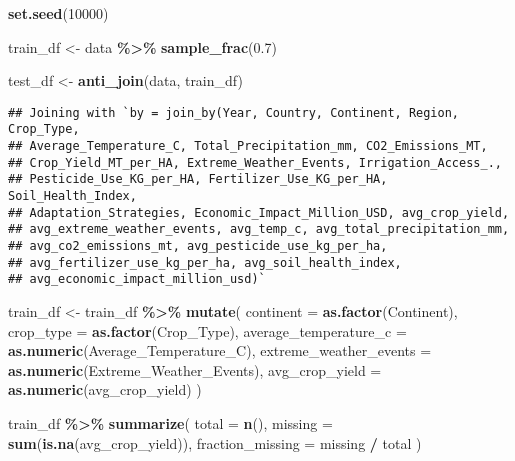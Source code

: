 \documentclass[
]{article}
\newenvironment{Shaded}{\begin{snugshade}}{\end{snugshade}}
\newcommand{\AttributeTok}[1]{\textcolor[rgb]{0.13,0.29,0.53}{#1}}
\newcommand{\DecValTok}[1]{\textcolor[rgb]{0.00,0.00,0.81}{#1}}
\newcommand{\FloatTok}[1]{\textcolor[rgb]{0.00,0.00,0.81}{#1}}
\newcommand{\FunctionTok}[1]{\textcolor[rgb]{0.13,0.29,0.53}{\textbf{#1}}}
\newcommand{\NormalTok}[1]{#1}
\newcommand{\OtherTok}[1]{\textcolor[rgb]{0.56,0.35,0.01}{#1}}
\newcommand{\SpecialCharTok}[1]{\textcolor[rgb]{0.81,0.36,0.00}{\textbf{#1}}}
\begin{document}
\begin{Shaded}
\begin{Highlighting}[]
\FunctionTok{set.seed}\NormalTok{(}\DecValTok{10000}\NormalTok{)}

\NormalTok{train\_df }\OtherTok{\textless{}{-}}\NormalTok{ data }\SpecialCharTok{\%\textgreater{}\%} \FunctionTok{sample\_frac}\NormalTok{(}\FloatTok{0.7}\NormalTok{)}

\NormalTok{test\_df }\OtherTok{\textless{}{-}} \FunctionTok{anti\_join}\NormalTok{(data, train\_df)}
\end{Highlighting}
\end{Shaded}

\begin{verbatim}
## Joining with `by = join_by(Year, Country, Continent, Region, Crop_Type,
## Average_Temperature_C, Total_Precipitation_mm, CO2_Emissions_MT,
## Crop_Yield_MT_per_HA, Extreme_Weather_Events, Irrigation_Access_.,
## Pesticide_Use_KG_per_HA, Fertilizer_Use_KG_per_HA, Soil_Health_Index,
## Adaptation_Strategies, Economic_Impact_Million_USD, avg_crop_yield,
## avg_extreme_weather_events, avg_temp_c, avg_total_precipitation_mm,
## avg_co2_emissions_mt, avg_pesticide_use_kg_per_ha,
## avg_fertilizer_use_kg_per_ha, avg_soil_health_index,
## avg_economic_impact_million_usd)`
\end{verbatim}

\begin{Shaded}
\begin{Highlighting}[]
\NormalTok{train\_df }\OtherTok{\textless{}{-}}\NormalTok{ train\_df }\SpecialCharTok{\%\textgreater{}\%}
  \FunctionTok{mutate}\NormalTok{(}
    \AttributeTok{continent =} \FunctionTok{as.factor}\NormalTok{(Continent),}
    \AttributeTok{crop\_type =} \FunctionTok{as.factor}\NormalTok{(Crop\_Type),}
    \AttributeTok{average\_temperature\_c =} \FunctionTok{as.numeric}\NormalTok{(Average\_Temperature\_C),}
    \AttributeTok{extreme\_weather\_events =} \FunctionTok{as.numeric}\NormalTok{(Extreme\_Weather\_Events), }
    \AttributeTok{avg\_crop\_yield =} \FunctionTok{as.numeric}\NormalTok{(avg\_crop\_yield) }
\NormalTok{  )}
\end{Highlighting}
\end{Shaded}

\begin{Shaded}
\begin{Highlighting}[]
\NormalTok{train\_df }\SpecialCharTok{\%\textgreater{}\%}
  \FunctionTok{summarize}\NormalTok{(}
    \AttributeTok{total =} \FunctionTok{n}\NormalTok{(),}
    \AttributeTok{missing =} \FunctionTok{sum}\NormalTok{(}\FunctionTok{is.na}\NormalTok{(avg\_crop\_yield)),}
    \AttributeTok{fraction\_missing =}\NormalTok{ missing }\SpecialCharTok{/}\NormalTok{ total}
\NormalTok{  )}
\end{Highlighting}
\end{Shaded}
\end{document}
